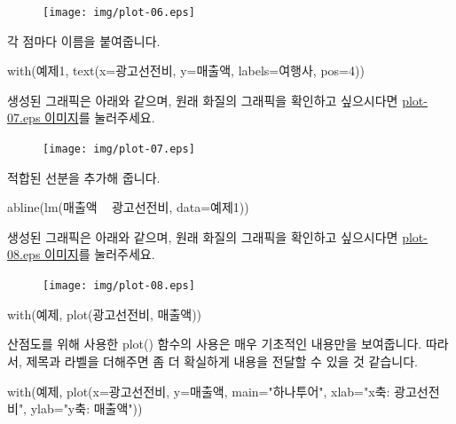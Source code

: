 \documentclass[../tutorial.tex]{subfiles}
\begin{document}
\begin{figure}
\begin{center}
\texttt{[image: img/plot-06.eps]}
\end{center}
\end{figure}

각 점마다 이름을 붙여줍니다.
\begin{Schunk}
\begin{Soutput}	
with(예제1, text(x=광고선전비, y=매출액, labels=여행사, pos=4))
\end{Soutput}
\end{Schunk}
생성된 그래픽은 아래와 같으며, 원래 화질의 그래픽을 확인하고 싶으시다면 \href{http://korea.gnu.org/gnustats/img/plot-07.eps}{plot-07.eps 이미지}를 눌러주세요. 

\begin{figure}
\begin{center}
\texttt{[image: img/plot-07.eps]}
\end{center}
\end{figure}

적합된 선분을 추가해 줍니다. 
\begin{Schunk}
\begin{Soutput}	
abline(lm(매출액 ~ 광고선전비, data=예제1))
\end{Soutput}
\end{Schunk}
생성된 그래픽은 아래와 같으며, 원래 화질의 그래픽을 확인하고 싶으시다면 \href{http://korea.gnu.org/gnustats/img/plot-08.eps}{plot-08.eps 이미지}를 눌러주세요. 

\begin{figure}
\begin{center}
\texttt{[image: img/plot-08.eps]}
\end{center}
\end{figure}

\begin{Schunk}
\begin{Soutput}
with(예제, plot(광고선전비, 매출액))
\end{Soutput}
\end{Schunk}

산점도를 위해 사용한 plot() 함수의 사용은 매우 기초적인 내용만을 보여줍니다. 
따라서, 제목과 라벨을 더해주면 좀 더 확실하게 내용을 전달할 수 있을 것 같습니다. 

\begin{Schunk}
\begin{Soutput}
with(예제, plot(x=광고선전비, y=매출액, main="하나투어", xlab="x축: 광고선전비", ylab="y축: 매출액"))
\end{Soutput}
\end{Schunk}
\end{document}
